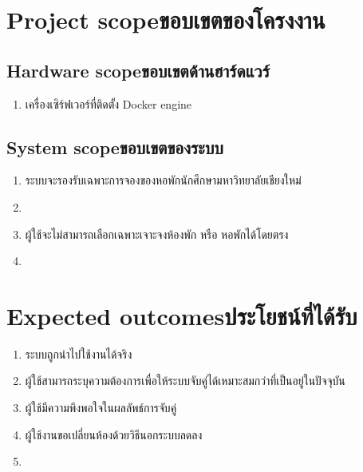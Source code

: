 \section{\ifenglish Project scope\else ขอบเขตของโครงงาน\fi}
\subsection{\ifenglish Hardware scope\else ขอบเขตด้านฮาร์ดแวร์\fi}
\begin{enumerate}
    \item เครื่องเซิร์ฟเวอร์ที่ติดตั้ง Docker engine
\end{enumerate}
\subsection{\ifenglish System scope\else ขอบเขตของระบบ\fi}
\begin{enumerate}
    \item ระบบจะรองรับเฉพาะการจองของหอพักนักศึกษามหาวิทยาลัยเชียงใหม่
    \item {}
    \item ผู้ใช้จะไม่สามารถเลือกเฉพาะเจาะจงห้องพัก หรือ หอพักได้โดยตรง
    \item {}
\end{enumerate}

\section{\ifenglish Expected outcomes\else ประโยชน์ที่ได้รับ\fi}
\begin{enumerate}
    \item ระบบถูกนำไปใช้งานได้จริง
    \item ผู้ใช้สามารถระบุความต้องการเพื่อให้ระบบจับคู่ได้เหมาะสมกว่าที่เป็นอยู่ในปัจจุบัน
    \item ผู้ใช้มีความพึงพอใจในผลลัพธ์การจับคู่
    \item ผู้ใช้งานขอเปลี่ยนห้องด้วยวิธีนอกระบบลดลง
    \item {}
\end{enumerate}

